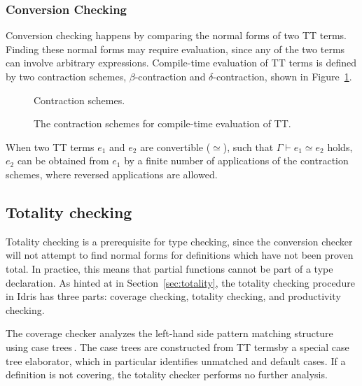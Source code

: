 \subsubsection{Conversion Checking}
Conversion checking happens by comparing the normal forms of two TT
terms. Finding these normal forms may require evaluation, since any of the two
terms can involve arbitrary expressions. Compile-time evaluation of TT terms is
defined by two contraction schemes, $\beta$-contraction and
$\delta$-contraction, shown in
Figure~\ref{fig:TT_contraction_schemes}. 
\begin{figure}
Contraction schemes.
\caption{The contraction schemes for compile-time evaluation of TT.}
\label{fig:TT_contraction_schemes}
\end{figure}
When two TT terms $e_{1}$ and $e_{2}$ are convertible ($\simeq$), such that
$\Gamma\vdash e_{1} \simeq e_{2}$ holds, $e_{2}$ can be
obtained from $e_{1}$ by a finite number of applications of the contraction
schemes, where reversed applications are allowed.


\subsection{Totality checking}
Totality checking is a prerequisite for type checking, since the conversion
checker will not attempt to find normal forms for definitions which have not
been proven total. In practice, this means that partial functions cannot be part
of a type declaration. As hinted at in Section~\ref{sec:totality}, the totality
checking procedure in Idris has three parts: coverage checking, totality
checking, and productivity checking.

The coverage checker analyzes the left-hand side pattern matching structure
using case trees\,\citep{Augustsson:1985}. The case trees are constructed from
TT termsby a special case tree elaborator, which in particular identifies
unmatched and default cases. If a definition is not covering, the totality
checker performs no further analysis.


